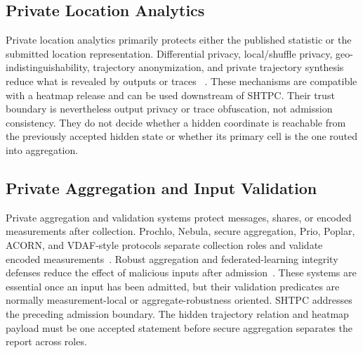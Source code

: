 \documentclass[journal]{IEEEtran}
\theoremstyle{definition}
\theoremstyle{plain}
\begin{document}
\subsection{Private Location Analytics}
\label{sec:related-location-analytics}

Private location analytics primarily protects either the published statistic or
the submitted location representation. Differential privacy, local/shuffle
privacy, geo-indistinguishability, trajectory anonymization, and private
trajectory synthesis reduce what is revealed by outputs or traces
~\cite{Dwork2006calibrating,Dwork2014algorithmic,Kairouz2021Advances,Mironov2017Renyi,Dong2022Gaussian,Warner1965Randomized,Erlingsson2014RAPPOR,Bassily2015Local,Wang2017LocalFreq,Wang2019MultidimLDP,Andres2013geoi,Chatzikokolakis2013Broadening,Bordenabe2014OptimalGeo,Gonzalez2008Mobility,Song2010Predictability,Montjoye2013Unique,Sweeney2002kAnon,Gruteser2003Anonymous,Hoh2007Preserving,Terrovitis2008Trajectory,Nergiz2009Towards,Primault2019Survey,Wang2023PrivTrace,Du2023LDPTrace}.
These mechanisms are compatible with a heatmap release and can be used
downstream of SHTPC. Their trust boundary is nevertheless output privacy or
trace obfuscation, not admission consistency. They do not decide whether a
hidden coordinate is reachable from the previously accepted hidden state or
whether its primary cell is the one routed into aggregation.

\subsection{Private Aggregation and Input Validation}
\label{sec:related-private-aggregation}

Private aggregation and validation systems protect messages, shares, or encoded
measurements after collection. Prochlo, Nebula, secure aggregation, Prio,
Poplar, ACORN, and VDAF-style protocols separate collection roles and validate
encoded measurements~\cite{Bittau2017Prochlo,Balle2019privacy,Cheu2019distributed,Erlingsson2019Amplification,Feldman2021Hiding,Balle2020PrivateSummation,Ghazi2021Power,Shamsabadi2025Nebula,Segal2017PracticalSecAgg,Bell2020SecureSingle,Corrigan2017Prio,Boneh2021Poplar,Bell2023ACORN,Barnes2026VDAF}.
Robust aggregation and federated-learning integrity defenses reduce the effect
of malicious inputs after admission~\cite{Chowdhury2022EIFFeL,Rathee2023ELSA,Xu2024Camel,Blanchard2017Krum,Yin2018Byzantine,Cao2021FLTrust,Fang2020Poisoning,Bagdasaryan2020Backdoor,Nguyen2022FLAME,Melis2019Inference}.
These systems are essential once an input has been admitted, but their
validation predicates are normally measurement-local or aggregate-robustness
oriented. \textsc{SHTPC} addresses the preceding admission boundary. The hidden
trajectory relation and heatmap payload must be one accepted statement before
secure aggregation separates the report across roles.
\end{document}
